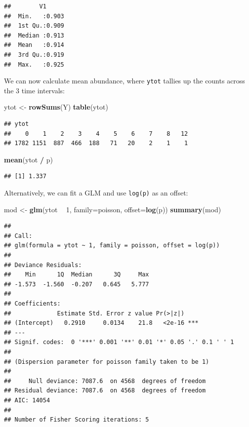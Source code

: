 \documentclass[12pt,]{book}
\newenvironment{Shaded}{\begin{snugshade}}{\end{snugshade}}
\newcommand{\DataTypeTok}[1]{\textcolor[rgb]{0.13,0.29,0.53}{#1}}
\newcommand{\DecValTok}[1]{\textcolor[rgb]{0.00,0.00,0.81}{#1}}
\newcommand{\KeywordTok}[1]{\textcolor[rgb]{0.13,0.29,0.53}{\textbf{#1}}}
\newcommand{\NormalTok}[1]{#1}
\newcommand{\OperatorTok}[1]{\textcolor[rgb]{0.81,0.36,0.00}{\textbf{#1}}}
\newcommand{\StringTok}[1]{\textcolor[rgb]{0.31,0.60,0.02}{#1}}
\begin{document}
\begin{verbatim}
##        V1       
##  Min.   :0.903  
##  1st Qu.:0.909  
##  Median :0.913  
##  Mean   :0.914  
##  3rd Qu.:0.919  
##  Max.   :0.925
\end{verbatim}

We can now calculate mean abundance, where \texttt{ytot} tallies up the counts
across the 3 time intervals:

\begin{Shaded}
\begin{Highlighting}[]
\NormalTok{ytot <-}\StringTok{ }\KeywordTok{rowSums}\NormalTok{(Y)}
\KeywordTok{table}\NormalTok{(ytot)}
\end{Highlighting}
\end{Shaded}

\begin{verbatim}
## ytot
##    0    1    2    3    4    5    6    7    8   12 
## 1782 1151  887  466  188   71   20    2    1    1
\end{verbatim}

\begin{Shaded}
\begin{Highlighting}[]
\KeywordTok{mean}\NormalTok{(ytot }\OperatorTok{/}\StringTok{ }\NormalTok{p)}
\end{Highlighting}
\end{Shaded}

\begin{verbatim}
## [1] 1.337
\end{verbatim}

Alternatively, we can fit a GLM and use \texttt{log(p)} as an offset:

\begin{Shaded}
\begin{Highlighting}[]
\NormalTok{mod <-}\StringTok{ }\KeywordTok{glm}\NormalTok{(ytot }\OperatorTok{~}\StringTok{ }\DecValTok{1}\NormalTok{, }\DataTypeTok{family=}\NormalTok{poisson, }\DataTypeTok{offset=}\KeywordTok{log}\NormalTok{(p))}
\KeywordTok{summary}\NormalTok{(mod)}
\end{Highlighting}
\end{Shaded}

\begin{verbatim}
## 
## Call:
## glm(formula = ytot ~ 1, family = poisson, offset = log(p))
## 
## Deviance Residuals: 
##    Min      1Q  Median      3Q     Max  
## -1.573  -1.560  -0.207   0.645   5.777  
## 
## Coefficients:
##             Estimate Std. Error z value Pr(>|z|)    
## (Intercept)   0.2910     0.0134    21.8   <2e-16 ***
## ---
## Signif. codes:  0 '***' 0.001 '**' 0.01 '*' 0.05 '.' 0.1 ' ' 1
## 
## (Dispersion parameter for poisson family taken to be 1)
## 
##     Null deviance: 7087.6  on 4568  degrees of freedom
## Residual deviance: 7087.6  on 4568  degrees of freedom
## AIC: 14054
## 
## Number of Fisher Scoring iterations: 5
\end{verbatim}
\end{document}

